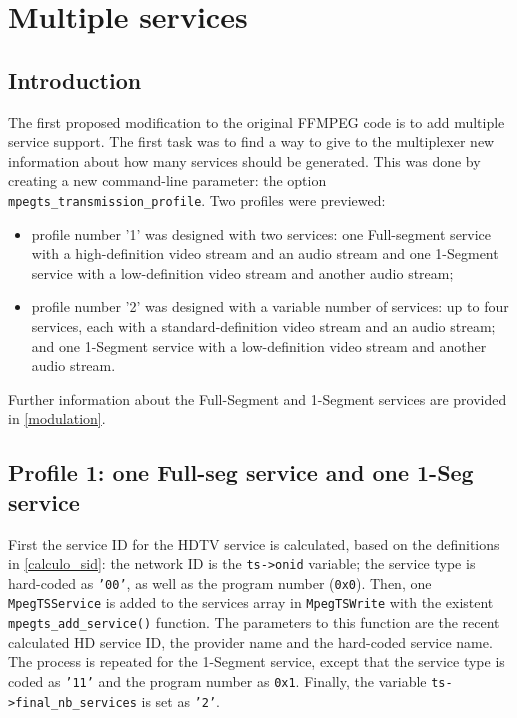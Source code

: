 \documentclass[
	12pt,				%
	openright,			%
	twoside,			%
	a4paper,			%
	brazil,
	french,				%
	english
	]{abntex2}
\begin{document}
\section{Multiple services}

\subsection{Introduction}

The first proposed modification to the original FFMPEG code is to add multiple service support. The first task was to find a way to give to the multiplexer new information about how many services should be generated. This was done by creating a new command-line parameter: the option \texttt{mpegts\_transmission\_profile}. Two profiles were previewed:
\begin{itemize}
\item profile number '1' was designed with two services: one Full-segment service with a high-definition video stream and an audio stream and one 1-Segment service with a low-definition video stream and another audio stream;
\item profile number '2' was designed with a variable number of services: up to four services, each with a standard-definition video stream and an audio stream; and one  1-Segment service with a low-definition video stream and another audio stream.
\end{itemize}

Further information about the Full-Segment and 1-Segment services are provided in \autoref{modulation}.

\subsection{Profile 1: one Full-seg service and one 1-Seg service}

First the service ID for the HDTV service is calculated, based on the definitions in \autoref{calculo_sid}: the network ID is the \texttt{ts->onid} variable; the service type is hard-coded as \texttt{'00'}, as well as the program number (\texttt{0x0}). Then, one \texttt{MpegTSService} is added to the services array in \texttt{MpegTSWrite} with the existent \texttt{mpegts\_add\_service()} function. The parameters to this function are the recent calculated HD service ID, the provider name and the hard-coded service name. The process is repeated for the 1-Segment service, except that the service type is coded as \texttt{'11'} and the program number as \texttt{0x1}. Finally, the variable \texttt{ts->final\_nb\_services} is set as \texttt{'2'}.
\end{document}
